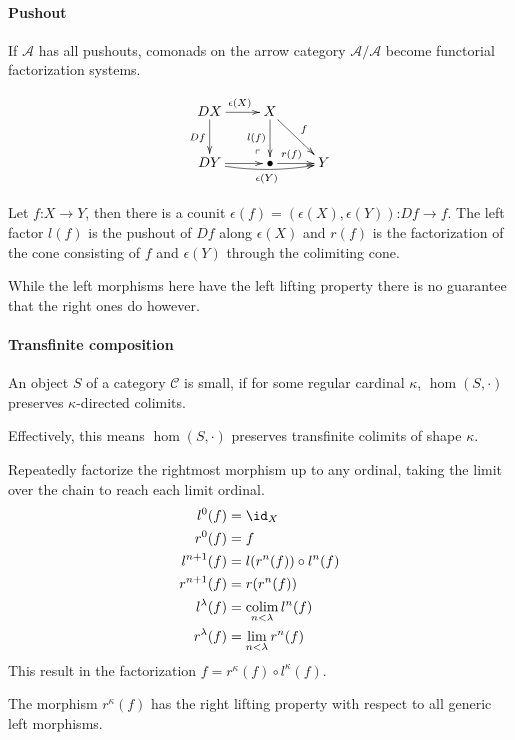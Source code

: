 \documentclass{tac}
\makeatletter
\newcommand\cat\mathcal
\newcommand\of{\mathord:}
\newcommand\colim{\mathop{\mathrm{colim}}}
\newcommand\pushed{\ar@{}[ul]|(.2)\ulcorner}
\makeatother
\begin{document}
\paragraph{Pushout}
If $\cat A$ has all pushouts, comonads on the arrow category $\cat A/\cat A$ become functorial factorization systems.

\[ \xymatrix{
DX\ar[d]_{Df}\ar[r]^{\epsilon (X)} & X\ar[dr]^f\ar[d]_{l(f)} \\
DY \ar[r]\ar@/_1ex/[rr]_{\epsilon (Y)}& \bullet\pushed \ar[r]^(.4){r(f)} & Y
}\]

Let $f\of X\to Y$, then there is a counit $\epsilon(f) = (\epsilon(X),\epsilon(Y))\of Df\to f$. The left factor $l(f)$ is the pushout of $Df$ along $\epsilon(X)$ and $r(f)$ is the factorization of the cone consisting of $f$ and $\epsilon(Y)$ through the colimiting cone.

While the left morphisms here have the left lifting property there is no guarantee that the right ones do however.

\paragraph{Transfinite composition}
\begin{definition}
An object $S$ of a category $\cat C$ is small, if for some regular cardinal $\kappa$, $\hom(S,\cdot)$ preserves $\kappa$-directed colimits.
\end{definition}

Effectively, this means $\hom(S,\cdot)$ preserves transfinite colimits of shape $\kappa$.

Repeatedly factorize the rightmost morphism up to any ordinal, taking the limit over the chain to reach each limit ordinal.
\begin{align*}
l^0(f) &= \id_X\\
r^0(f) &= f\\
l^{n+1}(f) &= l(r^n(f))\circ l^n(f)\\
r^{n+1}(f) &= r(r^n(f))\\
l^\lambda(f) &= \colim_{n<\lambda} l^n(f) \\
r^\lambda(f) &= \lim_{n<\lambda} r^n(f)
\end{align*}
This result in the factorization $f = r^\kappa(f)\circ l^\kappa(f)$. 

\begin{lemma} The morphism $r^\kappa(f)$ has the right lifting property with respect to all generic left morphisms.
\end{lemma}
\end{document}

